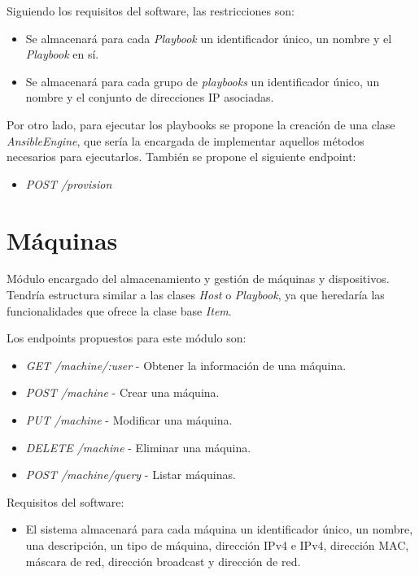 Siguiendo los requisitos del software, las restricciones son:
\begin{itemize}
	\item Se almacenará para cada \textit{Playbook} un identificador único, un nombre y el \textit{Playbook} en sí.
	\item Se almacenará para cada grupo de \textit{playbooks} un identificador único, un nombre y el conjunto de direcciones IP asociadas.
\end{itemize}

\bigskip
Por otro lado, para ejecutar los playbooks se propone la creación de una clase \textit{AnsibleEngine}, que sería la encargada de implementar aquellos métodos necesarios para ejecutarlos. También se propone el siguiente endpoint:
\begin{itemize}
	\item \textit{POST /provision}
\end{itemize}




\section{Máquinas}

Módulo encargado del almacenamiento y gestión de máquinas y dispositivos. Tendría estructura similar a las clases \textit{Host} o \textit{Playbook}, ya que heredaría las funcionalidades que ofrece la clase base \textit{Item}.

\bigskip
Los endpoints propuestos para este módulo son:
\begin{itemize}
	\item \textit{GET /machine/:user} - Obtener la información de una máquina.
	\item \textit{POST /machine} - Crear una máquina.
	\item \textit{PUT /machine} - Modificar una máquina.
	\item \textit{DELETE /machine} - Eliminar una máquina.
	\item \textit{POST /machine/query} - Listar máquinas.
\end{itemize}



\bigskip
Requisitos del software:
\begin{itemize}
	\item El sistema almacenará para cada máquina un identificador único, un nombre, una descripción, un tipo de máquina, dirección IPv4 e IPv4, dirección MAC, máscara de red, dirección broadcast y dirección de red.
\end{itemize}





